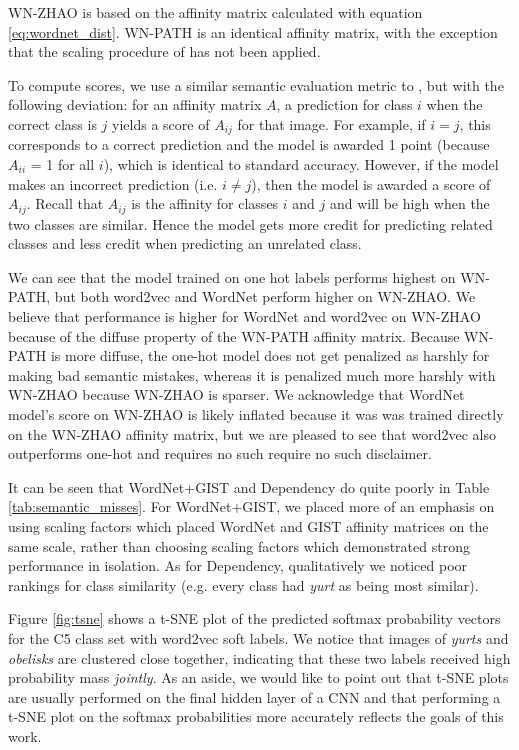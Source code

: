WN-ZHAO is based on the affinity matrix calculated with equation
\ref{eq:wordnet_dist}. WN-PATH is an identical affinity matrix, with the
exception that the scaling procedure of \cite{zhao2011large} has not been
applied.

To compute scores, we use a similar semantic evaluation metric to
\cite{zhao2011large}, but with the following deviation: for an affinity matrix
$A$, a prediction for class $i$ when the correct class is $j$ yields a score of
$A_{ij}$ for that image. For example, if $i = j$, this corresponds to a correct
prediction and the model is awarded 1 point (because $A_{ii}$ = 1 for all $i$),
which is identical to standard accuracy. However, if the model makes an
incorrect prediction (i.e. $i \neq j$), then the model is awarded a score of
$A_{ij}$.  Recall that $A_{ij}$ is the affinity for classes $i$ and $j$ and will
be high when the two classes are similar. Hence the model gets more credit for
predicting related classes and less credit when predicting an unrelated class.

We can see that the model trained on one hot labels performs highest on WN-PATH,
but both word2vec and WordNet perform higher on WN-ZHAO. We believe that
performance is higher for WordNet and word2vec on WN-ZHAO because of the diffuse
property of the WN-PATH affinity matrix. Because WN-PATH is more diffuse, the
one-hot model does not get penalized as harshly for making bad semantic
mistakes, whereas it is penalized much more harshly with WN-ZHAO because WN-ZHAO
is sparser.  We acknowledge that WordNet model's score on WN-ZHAO is likely
inflated because it was was trained directly on the WN-ZHAO affinity matrix, but
we are pleased to see that word2vec also outperforms one-hot and requires no
such require no such disclaimer.

It can be seen that WordNet+GIST and Dependency do quite poorly in Table
\ref{tab:semantic_misses}. For WordNet+GIST, we placed more of an emphasis on
using scaling factors which placed WordNet and GIST affinity matrices on the
same scale, rather than choosing scaling factors which demonstrated strong
performance in isolation. As for Dependency, qualitatively we noticed poor
rankings for class similarity (e.g. every class had \emph{yurt} as being most
similar).

Figure \ref{fig:tsne} shows a t-SNE plot of the predicted softmax probability
vectors for the C5 class set with word2vec soft labels. We notice that images of
\emph{yurts} and \emph{obelisks} are clustered close together, indicating that
these two labels received high probability mass \emph{jointly}. As an aside, we
would like to point out that t-SNE plots are usually performed on the final
hidden layer of a CNN and that performing a t-SNE plot on the softmax
probabilities more accurately reflects the goals of this work.

